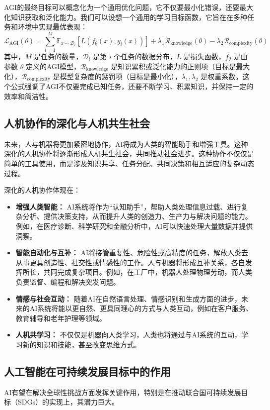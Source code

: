 AGI的最终目标可以概念化为一个通用优化问题，它不仅要最小化错误，还要最大化知识获取和泛化能力。我们可以设想一个通用的学习目标函数，它旨在在多种任务和环境中实现最优表现：
$$
\mathcal{L}_{\text{AGI}}(\theta) = \sum_{i=1}^{M} \mathbb{E}_{x \sim \mathcal{D}_i} \left[ L(f_\theta(x), y_i(x)) \right] + \lambda_1 \mathcal{R}_{\text{knowledge}}(\theta) - \lambda_2 \mathcal{R}_{\text{complexity}}(\theta)
$$
其中，$M$ 是任务的数量，$\mathcal{D}_i$ 是第 $i$ 个任务的数据分布，$L$ 是损失函数，$f_\theta$ 是由参数 $\theta$ 定义的AGI模型，$\mathcal{R}_{\text{knowledge}}$ 是知识累积或泛化能力的正则项（目标是最大化），$\mathcal{R}_{\text{complexity}}$ 是模型复杂度的惩罚项（目标是最小化），$\lambda_1, \lambda_2$ 是权重系数。这个公式强调了AGI不仅要完成已知任务，还要不断学习、积累知识，并保持一定的效率和简洁性。

\subsection{人机协作的深化与人机共生社会}
未来，人与机器将更加紧密地协作，AI将成为人类的智能助手和增强工具。这种深化的人机协作将逐渐形成人机共生社会，共同推动社会进步。这种协作不仅仅是简单的工具使用，而是涉及知识共享、任务分配、共同决策和相互适应的复杂动态过程。

深化的人机协作体现在：
\begin{itemize}
    \item \textbf{增强人类智能：} AI系统将作为“认知助手”，帮助人类处理信息过载、进行复杂分析、提供决策支持，从而提升人类的创造力、生产力与解决问题的能力。例如，在医疗诊断、科学研究和金融分析中，AI可以快速处理大量数据并提供洞察。
    \item \textbf{智能自动化与互补：} AI将接管重复性、危险性或高精度的任务，解放人类去从事更具创造性、社交性或情感性的工作。人与机器将形成互补关系，各自发挥所长，共同完成复杂项目。例如，在工厂中，机器人处理物理劳动，而人类负责监督、编程和解决突发问题。
    \item \textbf{情感与社会互动：} 随着AI在自然语言处理、情感识别和生成方面的进步，未来的AI系统将能以更自然、更具同理心的方式与人类互动，例如在客户服务、教育辅导和老年护理等领域。
    \item \textbf{人机共学习：} 不仅仅是机器向人类学习，人类也将通过与AI系统的互动，学习新的知识和技能，甚至改变思维方式。
\end{itemize}

\subsection{人工智能在可持续发展目标中的作用}
AI有望在解决全球性挑战方面发挥关键作用，特别是在推动联合国可持续发展目标（SDGs）的实现上，其潜力巨大。

